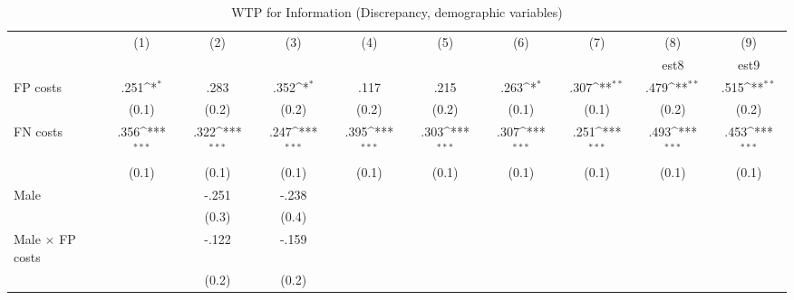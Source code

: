 \begin{table}[htbp]\centering
\def\sym#1{\ifmmode^{#1}\else\(^{#1}\)\fi}
\caption{WTP for Information (Discrepancy, demographic variables)}
\begin{tabular}{l*{9}{c}}
\hline\hline
                &\multicolumn{1}{c}{(1)}&\multicolumn{1}{c}{(2)}&\multicolumn{1}{c}{(3)}&\multicolumn{1}{c}{(4)}&\multicolumn{1}{c}{(5)}&\multicolumn{1}{c}{(6)}&\multicolumn{1}{c}{(7)}&\multicolumn{1}{c}{(8)}&\multicolumn{1}{c}{(9)}\\
                &\multicolumn{1}{c}{}&\multicolumn{1}{c}{}&\multicolumn{1}{c}{}&\multicolumn{1}{c}{}&\multicolumn{1}{c}{}&\multicolumn{1}{c}{}&\multicolumn{1}{c}{}&\multicolumn{1}{c}{est8}&\multicolumn{1}{c}{est9}\\
\hline
FP costs        &     .251\sym{*}  &     .283         &     .352\sym{*}  &     .117         &     .215         &     .263\sym{*}  &     .307\sym{**} &     .479\sym{**} &     .515\sym{**} \\
                &    (0.1)         &    (0.2)         &    (0.2)         &    (0.2)         &    (0.2)         &    (0.1)         &    (0.1)         &    (0.2)         &    (0.2)         \\
FN costs        &     .356\sym{***}&     .322\sym{***}&     .247\sym{***}&     .395\sym{***}&     .303\sym{***}&     .307\sym{***}&     .251\sym{***}&     .493\sym{***}&     .453\sym{***}\\
                &    (0.1)         &    (0.1)         &    (0.1)         &    (0.1)         &    (0.1)         &    (0.1)         &    (0.1)         &    (0.1)         &    (0.1)         \\
Male            &                  &    -.251         &    -.238         &                  &                  &                  &                  &                  &                  \\
                &                  &    (0.3)         &    (0.4)         &                  &                  &                  &                  &                  &                  \\
Male $\times$ FP costs&                  &    -.122         &    -.159         &                  &                  &                  &                  &                  &                  \\
                &                  &    (0.2)         &    (0.2)         &                  &                  &                  &                  &                  &                  \\

\end{tabular}
\end{table}
